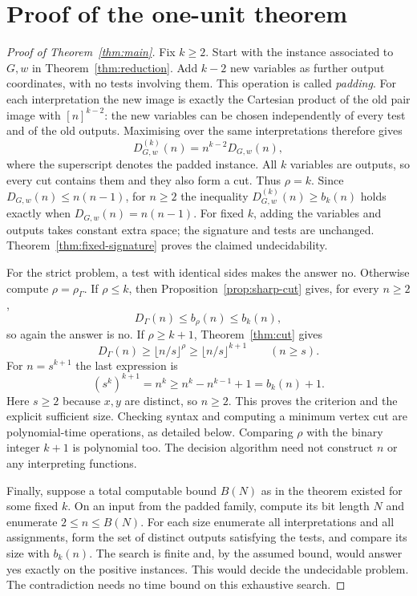 \documentclass[12pt]{article}
\theoremstyle{definition}
\begin{document}
\section{Proof of the one-unit theorem}\label{sec:mainproof}
\begin{proof}[Proof of Theorem~\ref{thm:main}]
Fix $k\ge2$. Start with the instance associated to $G,w$ in
Theorem~\ref{thm:reduction}. Add $k-2$ new variables as further output
coordinates, with no tests involving them. This operation is called
\emph{padding}. For each interpretation the new image is exactly the
Cartesian product of the old pair image with $[n]^{k-2}$: the new
variables can be chosen independently of every test and of the old
outputs. Maximising over the same interpretations therefore gives
\[
 D_{G,w}^{(k)}(n)=n^{k-2}D_{G,w}(n),
\]
where the superscript denotes the padded instance.
All $k$ variables are outputs, so every cut contains them and they
also form a cut. Thus $\rho=k$.
Since $D_{G,w}(n)\le n(n-1)$, for $n\ge2$ the inequality
$D_{G,w}^{(k)}(n)\ge b_k(n)$ holds exactly when
$D_{G,w}(n)=n(n-1)$. For fixed $k$, adding the variables and outputs
takes constant extra space; the signature and tests are unchanged.
Theorem~\ref{thm:fixed-signature} proves the claimed undecidability.

For the strict problem, a test with identical sides makes the answer
no. Otherwise compute $\rho=\rho_\Gamma$. If $\rho\le k$, then
Proposition~\ref{prop:sharp-cut} gives, for every $n\ge2$,
\[
 D_\Gamma(n)\le b_\rho(n)\le b_k(n),
\]
so again the answer is no. If $\rho\ge k+1$, Theorem~\ref{thm:cut} gives
\[
 D_\Gamma(n)\ge\lfloor n/s\rfloor^\rho
                 \ge\lfloor n/s\rfloor^{k+1}\qquad(n\ge s).
\]
For $n=s^{k+1}$ the last expression is
\[
 (s^k)^{k+1}=n^k\ge n^k-n^{k-1}+1=b_k(n)+1.
\]
Here $s\ge2$ because $x,y$ are distinct, so $n\ge2$.
This proves the criterion and the explicit sufficient size.
Checking syntax and computing a minimum vertex cut are polynomial-time
operations, as detailed below. Comparing $\rho$ with the binary
integer $k+1$ is polynomial too. The decision algorithm need not
construct $n$ or any interpreting functions.

Finally, suppose a total computable bound $B(N)$ as in the theorem
existed for some fixed $k$. On an input from the padded family,
compute its bit length $N$ and enumerate $2\le n\le B(N)$.
For each size enumerate all interpretations and all assignments,
form the set of distinct outputs satisfying the tests, and compare its
size with $b_k(n)$. The search is finite and, by the assumed bound,
would answer yes exactly on the positive instances. This would decide
the undecidable problem. The contradiction needs no time bound on
this exhaustive search.
\end{proof}
\end{document}
